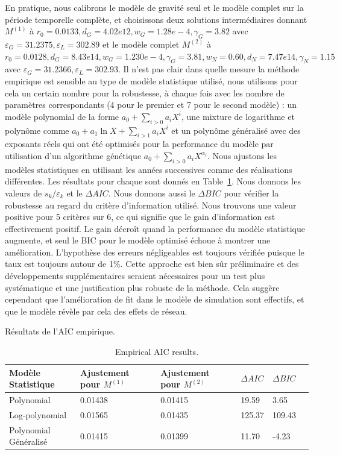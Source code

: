 {En pratique, nous calibrons le modèle de gravité seul et le modèle complet sur la période temporelle complète, et choisissons deux solutions intermédiaires donnant $M^{(1)}$ à $r_0=0.0133, d_G = 4.02e12, w_G = 1.28e-4, \gamma_G = 3.82$ avec $\varepsilon_G=31.2375,\varepsilon_L=302.89$ et le modèle complet $M^{(2)}$ à $r_0=0.0128, d_G = 8.43e14, w_G = 1.230e-4, \gamma_G = 3.81, w_N=0.60, d_N=7.47e14, \gamma_N = 1.15$ avec $\varepsilon_G=31.2366,\varepsilon_L=302.93$. Il n'est pas clair dans quelle mesure la méthode empirique est sensible au type de modèle statistique utilisé, nous utilisons pour cela un certain nombre pour la robustesse, à chaque fois avec les nombre de paramètres correspondants (4 pour le premier et 7 pour le second modèle) : un modèle polynomial de la forme $a_0 + \sum_{i>0} a_i X^i$, une mixture de logarithme et polynôme comme $a_0 + a_1 \ln X + \sum_{i>1} a_i X^i$ et un polynôme généralisé avec des exposants réels qui ont été optimisés pour la performance du modèle par utilisation d'un algorithme génétique $a_0 + \sum_{i>0} a_i X^{\alpha_i}$. Nous ajustons les modèles statistiques en utilisant les années successives comme des réalisations différentes. Les résultats pour chaque sont donnés en Table~\ref{tab:interactiongibrat:empiricalaic}. Nous donnons les valeurs de $s_k / \varepsilon_k$ et le $\Delta AIC$. Nous donnons aussi le $\Delta BIC$ pour vérifier la robustesse au regard du critère d'information utilisé. Nous trouvons une valeur positive pour 5 critères sur 6, ce qui signifie que le gain d'information est effectivement positif. Le gain décroît quand la performance du modèle statistique augmente, et seul le BIC pour le modèle optimisé échoue à montrer une amélioration. L'hypothèse des erreurs négligeables est toujours vérifiée puisque le taux est toujours autour de 1\%. Cette approche est bien sûr préliminaire et des développements supplémentaires seraient nécessaires pour un test plus systématique et une justification plus robuste de la méthode. Cela suggère cependant que l'amélioration de fit dans le modèle de simulation sont effectifs, et que le modèle révèle par cela des effets de réseau.
}




\begin{table}[ht]
\caption{Empirical AIC results.}{Résultats de l'AIC empirique.\label{tab:interactiongibrat:empiricalaic}}
\begin{tabular}{|l|l|l|l|l|l}
\toprule
Modèle Statistique & Ajustement pour $M^{(1)}$ & Ajustement pour $M^{(2)}$ & $\Delta AIC$ & $\Delta BIC$\\
\midrule
Polynomial & 0.01438 & 0.01415 & 19.59 & 3.65\\
Log-polynomial & 0.01565  & 0.01435 & 125.37 & 109.43\\
Polynomial Généralisé & 0.01415  & 0.01399 & 11.70 & -4.23\\
\bottomrule
\end{tabular}
\end{table}







